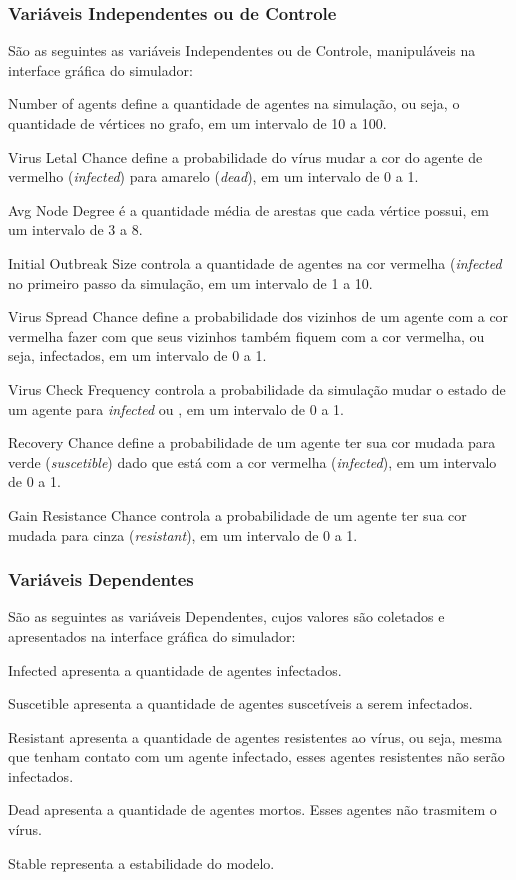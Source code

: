 \subsubsection{Variáveis Independentes ou de Controle}

São as seguintes as variáveis Independentes ou de Controle, manipuláveis na interface gráfica do simulador:
\begin{description}
\item Number of agents define a quantidade de agentes na simulação, ou seja, o quantidade de vértices no grafo, em um intervalo de 10 a 100.
\item Virus Letal Chance define a probabilidade do vírus mudar a cor do agente de vermelho (\textit{infected}) para amarelo (\textit{dead}), em um intervalo de 0 a 1.
\item Avg Node Degree é a quantidade média de arestas que cada vértice possui, em um intervalo de 3 a 8.
\item Initial Outbreak Size controla a quantidade de agentes na cor vermelha (\textit{infected} no primeiro passo da simulação, em um intervalo de 1 a 10.
\item Virus Spread Chance define a probabilidade dos vizinhos de um agente com a cor vermelha fazer com que seus vizinhos também fiquem com a cor vermelha, ou seja, infectados, em um intervalo de 0 a 1.
\item Virus Check Frequency controla a probabilidade da simulação mudar o estado de um agente para \textit{infected} ou , em um intervalo de 0 a 1.
\item Recovery Chance define a probabilidade de um agente ter sua cor mudada para verde (\textit{suscetible}) dado que está com a cor vermelha (\textit{infected}), em um intervalo de 0 a 1.
\item Gain Resistance Chance controla a probabilidade de um agente ter sua cor mudada para cinza (\textit{resistant}), em um intervalo de 0 a 1.
\end{description}

\subsubsection{Variáveis Dependentes}

São as seguintes as variáveis Dependentes, cujos valores são coletados e apresentados na interface gráfica do simulador:
\begin{description}
\item Infected apresenta a quantidade de agentes infectados.
\item Suscetible apresenta a quantidade de agentes suscetíveis a serem infectados. 
\item Resistant apresenta a quantidade de agentes resistentes ao vírus, ou seja, mesma que tenham contato com um agente infectado, esses agentes resistentes não serão infectados.
\item Dead apresenta a quantidade de agentes mortos. Esses agentes não trasmitem o vírus.
\item Stable representa a estabilidade do modelo.
\end{description}


